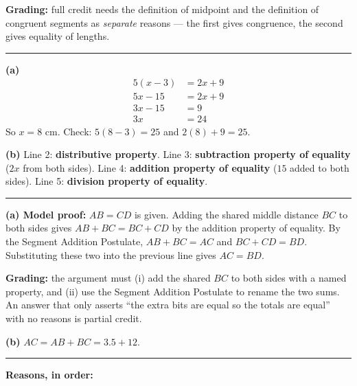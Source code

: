 \documentclass[12pt]{article}
\begin{document}
\textbf{Grading:} full credit needs the definition of midpoint and the definition of congruent segments as \emph{separate} reasons --- the first gives congruence, the second gives equality of lengths.

\vspace{0.2cm}\noindent\rule{\linewidth}{0.2pt}


\textbf{(a)}
\begin{align*}
  5(x - 3) &= 2x + 9 \\
  5x - 15 &= 2x + 9 \\
  3x - 15 &= 9 \\
  3x &= 24
\end{align*}
So $x = 8$ cm. Check: $5(8 - 3) = 25$ and $2(8) + 9 = 25$. 

\textbf{(b)} Line 2: \textbf{distributive property}. Line 3: \textbf{subtraction property of equality} ($2x$ from both sides). Line 4: \textbf{addition property of equality} ($15$ added to both sides). Line 5: \textbf{division property of equality}.

\vspace{0.2cm}\noindent\rule{\linewidth}{0.2pt}


\textbf{(a) Model proof:} $AB = CD$ is given. Adding the shared middle distance $BC$ to both sides gives $AB + BC = BC + CD$ by the addition property of equality. By the Segment Addition Postulate, $AB + BC = AC$ and $BC + CD = BD$. Substituting these two into the previous line gives $AC = BD$.

\textbf{Grading:} the argument must (i) add the shared $BC$ to both sides with a named property, and (ii) use the Segment Addition Postulate to rename the two sums. An answer that only asserts ``the extra bits are equal so the totals are equal'' with no reasons is partial credit.

\textbf{(b)} $AC = AB + BC = 3.5 + 12$. 

\vspace{0.2cm}\noindent\rule{\linewidth}{0.2pt}


\textbf{Reasons, in order:}
\end{document}
